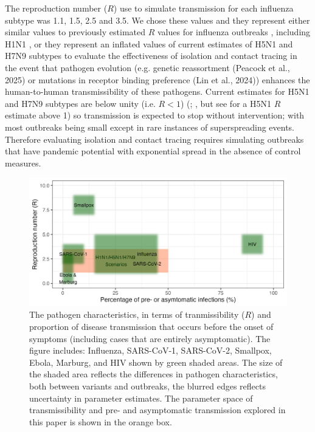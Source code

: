 \documentclass{article}
\begin{document}
The reproduction number ($R$) use to simulate transmission for each influenza subtype was 1.1, 1.5, 2.5 and 3.5. We chose these values and they represent either similar values to previously estimated $R$ values for influenza outbreaks \citep{fergusonStrategiesMitigatingInfluenza2006}, including H1N1 \citep{fraserPandemicPotentialStrain2009, lesslerOutbreak2009Pandemic2009}, or they represent an inflated values of current estimates of H5N1 and H7N9 subtypes to evaluate the effectiveness of isolation and contact tracing in the event that pathogen evolution (e.g. genetic reassortment (Peacock et al., 2025) or mutations in receptor binding preference (Lin et al., 2024)) enhances the human-to-human transmissibility of these pathogens. Current estimates for H5N1 and H7N9 subtypes are below unity (i.e. $R < 1$) (\citealt{tannerPandemicPotentialAvian2015}; \citealt{Ward2024.12.11.24318702}, but see \citealt{yangDetectingHumanhumanTransmission2007a} for a H5N1 $R$ estimate above 1) so transmission is expected to stop without intervention; with most outbreaks being small except in rare instances of superspreading events. Therefore evaluating isolation and contact tracing requires simulating outbreaks that have pandemic potential with exponential spread in the absence of control measures.

\begin{figure}[ht]
\centering
\includegraphics[width=\textwidth]{../plots/patho_param_space.png}
\caption{The pathogen characteristics, in terms of tranmissibility ($R$) and proportion of disease transmission that occurs before the onset of symptoms (including cases that are entirely asymptomatic). The figure includes: Influenza, SARS-CoV-1, SARS-CoV-2, Smallpox, Ebola, Marburg, and HIV shown by green shaded areas. The size of the shaded area reflects the differences in pathogen characteristics, both between variants and outbreaks, the blurred edges reflects uncertainty in parameter estimates. The parameter space of transmissibility and pre- and asymptomatic transmission explored in this paper is shown in the orange box.}
\label{fig:patho-param-space}
\end{figure}
\end{document}
